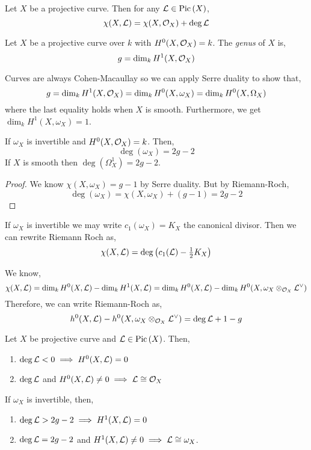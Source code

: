 \documentclass[12pt]{article}
\begin{document}
\begin{theorem}
Let $X$ be a projective curve. Then for any $\mathcal{L} \in \mathrm{Pic} \left( X \right)$,
\[ \chi(X, \mathcal{L}) = \chi(X, \mathcal{O}_{X}) + \deg{\mathcal{L}} \]
\end{theorem}

\begin{defn}
Let $X$ be a projective curve over $k$ with $H^0(X, \mathcal{O}_{X}) = k$. The \textit{genus} of $X$ is,
\[ g = \dim_k H^1(X, \mathcal{O}_{X}) \]
\end{defn}

\begin{rmk}
Curves are always Cohen-Macaullay so we can apply Serre duality to show that,
\[ g = \dim_k H^1(X, \mathcal{O}_{X}) = \dim_k H^0(X, \omega_X) = \dim_k H^0(X, \Omega_X) \]
where the last equality holds when $X$ is smooth. Furthermore, we get $\dim_k H^1(X, \omega_X) = 1$.
\end{rmk}

\begin{cor}
If $\omega_X$ is invertible and $H^0(X, \mathcal{O}_{X}) = k$. Then,
\[ \deg{(\omega_X)} = 2 g - 2 \]
If $X$ is smooth then $\deg{(\Omega^1_X)} = 2 g - 2$.
\end{cor}

\begin{proof}
We know $\chi(X, \omega_X) = g - 1$ by Serre duality. But by Riemann-Roch,
\[ \deg{(\omega_X)} = \chi(X, \omega_X)  + (g - 1) = 2 g - 2 \]
\end{proof}

\begin{rmk}
If $\omega_X$ is invertible we may write $c_1(\omega_X) = K_X$ the canonical divisor. Then we can rewrite Riemann Roch as,
\[ \chi(X, \mathcal{L}) = \deg{ \left( c_1(\mathcal{L}) - \tfrac{1}{2} K_X \right) } \]
\end{rmk}

\begin{rmk}
We know,
\[ \chi(X, \mathcal{L}) = \dim_k H^0(X, \mathcal{L}) - \dim_k H^1(X, \mathcal{L}) = \dim_k H^0(X, \mathcal{L}) - \dim_k H^0(X, \omega_X \otimes_{\mathcal{O}_{X}} \mathcal{L}^\vee) \]
Therefore, we can write Riemann-Roch as,
\[ h^0(X, \mathcal{L}) - h^0(X, \omega_X \otimes_{\mathcal{O}_{X}} \mathcal{L}^\vee) = \deg{\mathcal{L}} + 1 - g \]
\end{rmk}

\begin{prop}
Let $X$ be projective curve and $\mathcal{L} \in \mathrm{Pic} \left( X \right)$. Then,
\begin{enumerate}
\item $\deg{\mathcal{L}} < 0 \implies H^0(X, \mathcal{L}) = 0$ 
\item $\deg{\mathcal{L}}$ and $H^0(X, \mathcal{L}) \neq 0 \implies \mathcal{L} \cong \mathcal{O}_{X}$
\end{enumerate}
If $\omega_X$ is invertible, then,
\begin{enumerate}
\item $\deg{\mathcal{L}} > 2g - 2 \implies H^1(X, \mathcal{L}) = 0$
\item $\deg{\mathcal{L}} = 2g - 2$ and $H^1(X, \mathcal{L}) \neq 0 \implies \mathcal{L} \cong \omega_X$.
\end{enumerate}
\end{prop}
\end{document}
